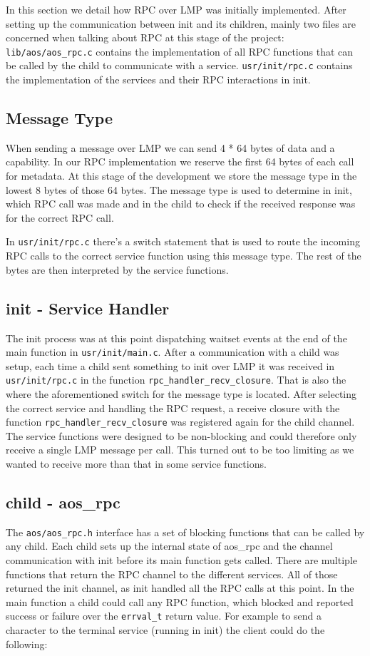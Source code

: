 In this section we detail how RPC over LMP was initially implemented. After setting up the communication between init and its children, mainly two files are concerned when talking about RPC at this stage of the project: \verb|lib/aos/aos_rpc.c| contains the implementation of all RPC functions that can be called by the child to communicate with a service. \verb|usr/init/rpc.c| contains the implementation of the services and their RPC interactions in init.

\subsection{Message Type}
When sending a message over LMP we can send 4 * 64 bytes of data and a capability. In our RPC implementation we reserve the first 64 bytes of each call for metadata. At this stage of the development we store the message type in the lowest 8 bytes of those 64 bytes. The message type is used to determine in init, which RPC call was made and in the child to check if the received response was for the correct RPC call.

In \verb|usr/init/rpc.c| there's a switch statement that is used to route the incoming RPC calls to the correct service function using this message type. The rest of the bytes are then interpreted by the service functions.

\subsection{init - Service Handler}
The init process was at this point dispatching waitset events at the end of the main function in \verb|usr/init/main.c|. After a communication with a child was setup, each time a child sent something to init over LMP it was received in \verb|usr/init/rpc.c| in the function \verb|rpc_handler_recv_closure|. That is also the where the aforementioned switch for the message type is located.
After selecting the correct service and handling the RPC request, a receive closure with the function \verb|rpc_handler_recv_closure| was registered again for the child channel. The service functions were designed to be non-blocking and could therefore only receive a single LMP message per call. This turned out to be too limiting as we wanted to receive more than that in some service functions.

\subsection{child - aos\_rpc}
The \verb|aos/aos_rpc.h| interface has a set of blocking functions that can be called by any child. Each child sets up the internal state of aos\_rpc and the channel communication with init before its main function gets called. There are multiple functions that return the RPC channel to the different services. All of those returned the init channel, as init handled all the RPC calls at this point.
In the main function a child could call any RPC function, which blocked and reported success or failure over the \verb|errval_t| return value. For example to send a character to the terminal service (running in init) the client could do the following:

